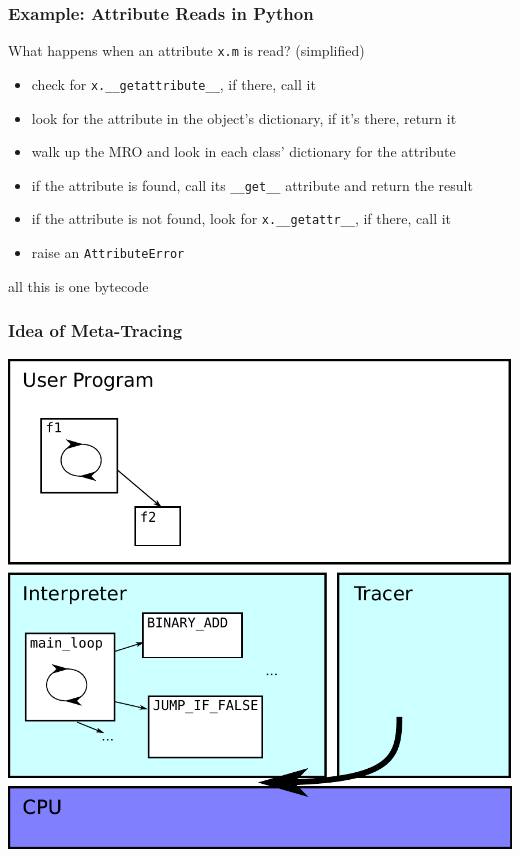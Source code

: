 \documentclass[utf8x]{beamer}
\begin{document}
\begin{frame}
  \frametitle{Example: Attribute Reads in Python}
  What happens when an attribute \texttt{x.m} is read? (simplified)
  \pause
  \begin{itemize}
      \item check for \texttt{x.\_\_getattribute\_\_}, if there, call it
      \pause
      \item look for the attribute in the object's dictionary, if it's there, return it
      \pause
      \item walk up the MRO and look in each class' dictionary for the attribute
      \pause
      \item if the attribute is found, call its \texttt{\_\_get\_\_} attribute and return the result
      \pause
      \item if the attribute is not found, look for \texttt{x.\_\_getattr\_\_}, if there, call it
      \pause
      \item raise an \texttt{AttributeError}
  \end{itemize}
  \pause
  all this is one bytecode
\end{frame}

\begin{frame}
  \frametitle{Idea of Meta-Tracing}
  \includegraphics[scale=0.5]{figures/trace05.pdf}
\end{frame}
\end{document}
